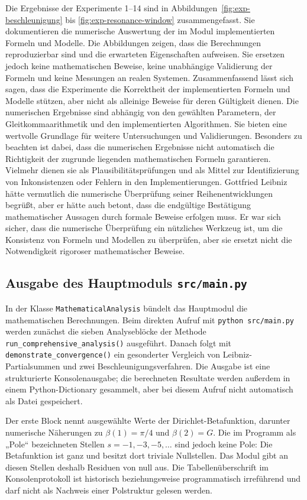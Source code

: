 \documentclass[a4paper,12pt,twoside]{report}
\theoremstyle{definition}
\begin{document}
Die Ergebnisse der Experimente 1--14 sind in Abbildungen~\ref{fig:exp-beschleunigung} bis \ref{fig:exp-resonance-window} zusammengefasst. Sie dokumentieren die numerische Auswertung der im Modul implementierten Formeln und Modelle. Die Abbildungen zeigen, dass die Berechnungen reproduzierbar sind und die erwarteten Eigenschaften aufweisen. Sie ersetzen jedoch keine mathematischen Beweise, keine unabhängige Validierung der Formeln und keine Messungen an realen Systemen.
Zusammenfassend lässt sich sagen, dass die Experimente die Korrektheit der implementierten Formeln und Modelle stützen, aber nicht als alleinige Beweise für deren Gültigkeit dienen. Die numerischen Ergebnisse sind abhängig von den gewählten Parametern, der Gleitkommaarithmetik und den implementierten Algorithmen. Sie bieten eine wertvolle Grundlage für weitere Untersuchungen und Validierungen.
Besonders zu beachten ist dabei, dass die numerischen Ergebnisse nicht automatisch die Richtigkeit der zugrunde liegenden mathematischen Formeln garantieren. Vielmehr dienen sie als Plausibilitätsprüfungen und als Mittel zur Identifizierung von Inkonsistenzen oder Fehlern in den Implementierungen.
Gottfried Leibniz hätte vermutlich die numerische Überprüfung seiner Reihenentwicklungen begrüßt, aber er hätte auch betont, dass die endgültige Bestätigung mathematischer Aussagen durch formale Beweise erfolgen muss.
Er war sich sicher, dass die numerische Überprüfung ein nützliches Werkzeug ist, um die Konsistenz von Formeln und Modellen zu überprüfen, aber sie ersetzt nicht die Notwendigkeit rigoroser mathematischer Beweise.

\subsection{Ausgabe des Hauptmoduls \texttt{src/main.py}}

In der Klasse \texttt{MathematicalAnalysis} bündelt das Hauptmodul die mathematischen Berechnungen. Beim direkten Aufruf mit \texttt{python src/main.py} werden zunächst die sieben Analyseblöcke der Methode \texttt{run\_comprehensive\_analysis()} ausgeführt. Danach folgt mit \texttt{demonstrate\_convergence()} ein gesonderter Vergleich von Leibniz-Partialsummen und zwei Beschleunigungsverfahren. Die Ausgabe ist eine strukturierte Konsolenausgabe; die berechneten Resultate werden außerdem in einem Python-Dictionary gesammelt, aber bei diesem Aufruf nicht automatisch als Datei gespeichert.

Der erste Block nennt ausgewählte Werte der Dirichlet-Betafunktion, darunter numerische Näherungen zu $\beta(1)=\pi/4$ und $\beta(2)=G$. Die im Programm als „Pole“ bezeichneten Stellen $s=-1,-3,-5,\ldots$ sind jedoch keine Pole: Die Betafunktion ist ganz und besitzt dort triviale Nullstellen. Das Modul gibt an diesen Stellen deshalb Residuen von null aus. Die Tabellenüberschrift im Konsolenprotokoll ist historisch beziehungsweise programmatisch irreführend und darf nicht als Nachweis einer Polstruktur gelesen werden.
\end{document}
